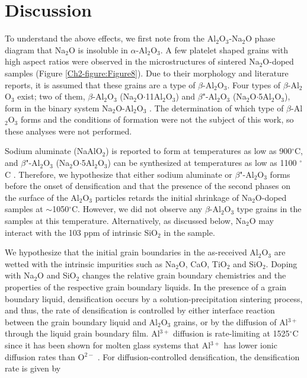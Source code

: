 \section{Discussion}

To understand the above effects, we first note from the Al$_{2}$O$_{3}$-Na$_{2}$O phase diagram \cite{Lambotte2013a} that Na$_{2}$O is insoluble in $\alpha$-Al$_{2}$O$_{3}$. A few platelet shaped grains with high aspect ratios were observed in the microstructures of sintered Na$_{2}$O-doped samples (Figure \ref{Ch2-figure:Figure8}). Due to their morphology and literature reports, \cite{Brownmiller1932a,PABLOGALAN1959,Rankin1916,Ridgway1936,Duncan1969a} it is assumed that these grains are a type of $\beta$-Al$_{2}$O$_{3}$. Four types of $\beta$-Al$_{2}$O$_{3}$ exist; two of them, $\beta$-Al$_{2}$O$_{3}$ (Na$_{2}$O$\cdot$11Al$_{2}$O$_{3}$) and $\beta$"-Al$_{2}$O$_{3}$ (Na$_{2}$O$\cdot$5Al$_{2}$O$_{3}$), form in the binary system Na$_{2}$O-Al$_{2}$O$_{3}$ \cite{Sutorik1998,Stevens1984}. The determination of which type of $\beta$-Al$_{2}$O$_{3}$ forms and the conditions of formation were not the subject of this work, so these analyses were not performed.

Sodium aluminate (NaAlO$_{2}$) is reported to form at temperatures as low as 900$^{\circ}$C,\cite{Christie1978} and $\beta$"-Al$_{2}$O$_{3}$ (Na$_{2}$O$\cdot$5Al$_{2}$O$_{3}$) can be synthesized at temperatures as low as 1100 $^{\circ}$C \cite{Brownmiller1932,Kummer1972,Vries1969}. Therefore, we hypothesize that either sodium aluminate or $\beta$"-Al$_{2}$O$_{3}$ forms before the onset of densification and that the presence of the second phases on the surface of the Al$_{2}$O$_{3}$ particles retards the initial shrinkage of Na$_{2}$O-doped samples at $\sim$1050$^{\circ}$C.  However, we did not observe any $\beta$-Al$_{2}$O$_{3}$ type grains in the samples at this temperature. Alternatively, as discussed below, Na$_{2}$O may interact with the 103 ppm of intrinsic SiO$_{2}$ in the sample.

We hypothesize that the initial grain boundaries in the as-received Al$_{2}$O$_{3}$ are wetted with the intrinsic impurities such as Na$_{2}$O, CaO, TiO$_{2}$ and SiO$_{2}$. Doping with Na$_{2}$O and SiO$_{2}$ changes the relative grain boundary chemistries and the properties of the respective grain boundary liquids. In the presence of a grain boundary liquid, densification occurs by a solution-precipitation sintering process, and thus, the rate of densification is controlled by either interface reaction between the grain boundary liquid and Al$_{2}$O$_{3}$ grains, or by the diffusion of Al$^{3+}$ through the liquid grain boundary film. Al$^{3+}$ diffusion is rate-limiting at 1525$^{\circ}$C since it has been shown for molten glass systems that Al$^{3+}$ has lower ionic diffusion rates than O$^{2-}$ \cite{Terai1975}. For diffusion-controlled densification, the densification rate is given by \cite{Kwon1990,Kwon1991}

